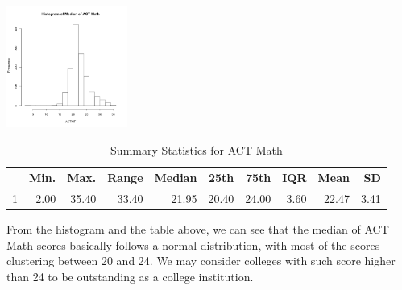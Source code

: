 \documentclass{article}\usepackage[]{graphicx}\usepackage[]{color}
\begin{document}
{\centering \includegraphics[width=150px]{../../images/histogram-ACTMTMedian} 

}


\begin{table}[ht]
\centering
\begin{tabular}{rrrrrrrrrr}
  \hline
 & Min. & Max. & Range & Median & 25th & 75th & IQR & Mean & SD \\ 
  \hline
1 & 2.00 & 35.40 & 33.40 & 21.95 & 20.40 & 24.00 & 3.60 & 22.47 & 3.41 \\ 
   \hline
\end{tabular}
\caption{Summary Statistics for ACT Math} 
\end{table}


From the histogram and the table above, we can see that the median of ACT Math scores basically follows a normal distribution, with most of the scores clustering between 20 and 24. We may consider colleges with such score higher than 24 to be outstanding as a college institution.
\end{document}
